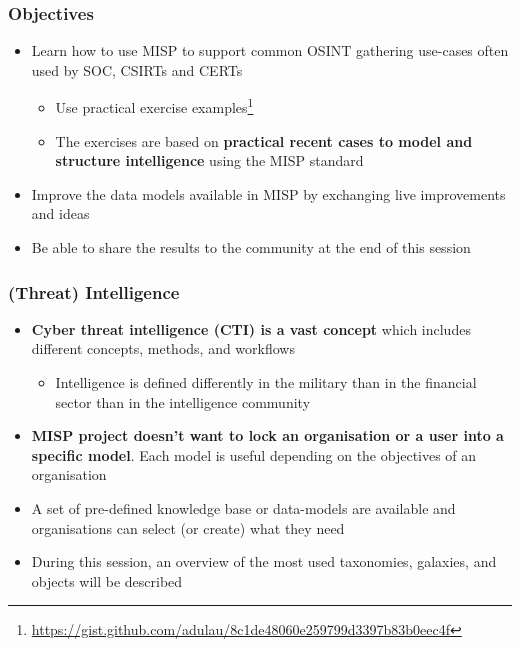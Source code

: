 
\begin{frame}[t,plain]
\titlepage
\end{frame}

\begin{frame}
\frametitle{Objectives}
\begin{itemize}
        \item Learn how to use MISP to support common OSINT gathering use-cases often used by SOC, CSIRTs and CERTs
                \begin{itemize}
                        \item Use practical exercise examples\footnote{\url{https://gist.github.com/adulau/8c1de48060e259799d3397b83b0eec4f}}
                        \item The exercises are based on {\bf practical recent cases to model and structure intelligence} using the MISP standard
                \end{itemize}
        \item Improve the data models available in MISP by exchanging live improvements and ideas
        \item Be able to share the results to the community at the end of this session
\end{itemize}
\end{frame}

\begin{frame}
\frametitle{(Threat) Intelligence}
\begin{itemize}
        \item {\bf Cyber threat intelligence (CTI) is a vast concept} which includes different concepts, methods, and workflows
                \begin{itemize}
                        \item Intelligence is defined differently in the military than in the financial sector than in the intelligence community
                \end{itemize}
        \item {\bf MISP project doesn't want to lock an organisation or a user into a specific model}. Each model is useful depending on the objectives of an organisation
        \item A set of pre-defined knowledge base or data-models are available and organisations can select (or create) what they need
        \item During this session, an overview of the most used taxonomies, galaxies, and objects will be described
\end{itemize}
\end{frame}

